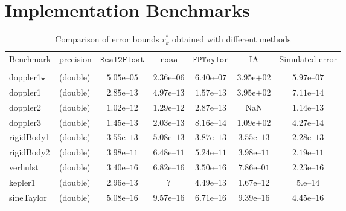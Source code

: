 \documentclass[preprint]{sigplanconf}
\newcommand{\nan}{\text{NaN}}
\newcommand{\realtofloat}{\mathtt{Real2Float}}
\newcommand{\rosa}{\mathtt{rosa}}
\newcommand{\fptaylor}{\mathtt{FPTaylor}}
\theoremstyle{plain}
\begin{document}
\section{Implementation Benchmarks} %
\label{sec:benchs}
\begin{table*}[!ht]
\begin{center}
\caption{Comparison of error bounds $r_k^*$ obtained with different methods}
\begin{tabular}{p{2.3cm}lccccc}
\hline
\multirow{2}{*}{Benchmark} & \multirow{2}{*}{precision} & \multirow{2}{*}{$\realtofloat$} & $\rosa$  & $\fptaylor$  &\multirow{2}{*}{IA} & \multirow{2}{*}{Simulated error}
\\
& & & \cite{Darulova14Popl} & \cite{fptaylor15} & & \\
\hline            
\multirow{1}{*}{doppler1$\star$}
& (double) & $5.05\text{e--}05$ & $2.36\text{e--}06$ & $6.40\text{e--}07$ & $3.95\text{e+}02$ & $5.97\text{e--}07$\\
\multirow{1}{*}{doppler1}
& (double) & $2.85\text{e--}13$ & $4.97\text{e--}13$ & $1.57\text{e--}13$ & $3.95\text{e+}02$ & $7.11\text{e--}14$\\
\multirow{1}{*}{doppler2}
& (double) & $1.02\text{e--}12$ & $1.29\text{e--}12$ & $2.87\text{e--}13$ & $\nan$ & $1.14\text{e--}13$\\
\multirow{1}{*}{doppler3}
& (double) & $1.45\text{e--}13$ & $2.03\text{e--}13$ & $8.16\text{e--}14$ & $1.09\text{e+}02$ & $4.27\text{e--}14$\\
\multirow{1}{*}{rigidBody1}
& (double) & $3.55\text{e--}13$ & $5.08\text{e--}13$ & $3.87\text{e--}13$ & $3.55\text{e--}13$ & $2.28\text{e--}13$\\
\multirow{1}{*}{rigidBody2}
& (double) & $3.98\text{e--}11$ & $6.48\text{e--}11$ & $5.24\text{e--}11$ & $3.98\text{e--}11$ & $2.19\text{e--}11$\\
\multirow{1}{*}{verhulst}
& (double) & $3.40\text{e--}16$ & $6.82\text{e--}16$ & $3.50\text{e--}16$ & $7.86\text{e--}01$ & $2.23\text{e--}16$\\
\multirow{1}{*}{kepler1}
& (double) & $2.96\text{e--}13$ & ? & $4.49\text{e--}13$ & $1.67\text{e--}12$ & $5.\text{e--}14$\\
\hline
\multirow{2}{*}{sineTaylor}
& (double) & $5.08\text{e--}16$ & $9.57\text{e--}16$ & $6.71\text{e--}16$ & $9.39\text{e--}16$ & $4.45\text{e--}16$\\

\end{tabular}
\end{center}
\end{table*}
\end{document}
